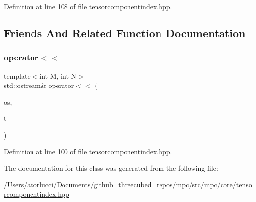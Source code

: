 Definition at line 108 of file tensorcomponentindex.\+hpp.



\subsection{Friends And Related Function Documentation}
\mbox{\label{classmpc_1_1core_1_1_c_tensor_rank2_component_index_a13d821c3dc9b99854bc96973ac0920b2}} 
\subsubsection{\texorpdfstring{operator$<$$<$}{operator<<}}
{\footnotesize\ttfamily template$<$int M, int N$>$ \\
std\+::ostream\& operator$<$$<$ (\begin{DoxyParamCaption}\item[{std\+::ostream \&}]{os,  }\item[{const \mbox{\hyperlink{classmpc_1_1core_1_1_c_tensor_rank2_component_index}{C\+Tensor\+Rank2\+Component\+Index}}$<$ M, N $>$ \&}]{t }\end{DoxyParamCaption})\hspace{0.3cm}{\ttfamily [friend]}}



Definition at line 100 of file tensorcomponentindex.\+hpp.



The documentation for this class was generated from the following file\+:\begin{DoxyCompactItemize}
\item 
/\+Users/atorlucci/\+Documents/github\+\_\+threecubed\+\_\+repos/mpc/src/mpc/core/\mbox{\hyperlink{tensorcomponentindex_8hpp}{tensorcomponentindex.\+hpp}}\end{DoxyCompactItemize}
